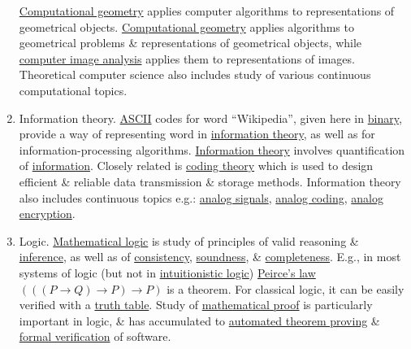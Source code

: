 \documentclass{article}
\begin{document}
\begin{enumerate}
	{\sf\href{https://en.wikipedia.org/wiki/Computational_geometry}{Computational geometry} applies computer algorithms to representations of geometrical objects.} \href{https://en.wikipedia.org/wiki/Computational_geometry}{Computational geometry} applies algorithms to geometrical problems \& representations of geometrical objects, while \href{https://en.wikipedia.org/wiki/Computer_image_analysis}{computer image analysis} applies them to representations of images. Theoretical computer science also includes study of various continuous computational topics.
	\item {\sf Information theory.} {\sf\href{https://en.wikipedia.org/wiki/ASCII}{ASCII} codes for word ``Wikipedia'', given here in \href{https://en.wikipedia.org/wiki/Binary_numeral_system}{binary}, provide a way of representing word in \href{https://en.wikipedia.org/wiki/Information_theory}{information theory}, as well as for information-processing algorithms.} \href{https://en.wikipedia.org/wiki/Information_theory}{Information theory} involves quantification of \href{https://en.wikipedia.org/wiki/Information}{information}. Closely related is \href{https://en.wikipedia.org/wiki/Coding_theory}{coding theory} which is used to design efficient \& reliable data transmission \& storage methods. Information theory also includes continuous topics e.g.: \href{https://en.wikipedia.org/wiki/Analog_signal}{analog signals}, \href{https://en.wikipedia.org/wiki/Analog_coding}{analog coding}, \href{https://en.wikipedia.org/wiki/Analog_encryption}{analog encryption}.
	\item {\sf Logic.} \href{https://en.wikipedia.org/wiki/Mathematical_logic}{Mathematical logic} is study of principles of valid reasoning \& \href{https://en.wikipedia.org/wiki/Inference}{inference}, as well as of \href{https://en.wikipedia.org/wiki/Consistency}{consistency}, \href{https://en.wikipedia.org/wiki/Soundness}{soundness}, \& \href{https://en.wikipedia.org/wiki/Completeness_(logic)}{completeness}. E.g., in most systems of logic (but not in \href{https://en.wikipedia.org/wiki/Intuitionistic_logic}{intuitionistic logic}) \href{https://en.wikipedia.org/wiki/Peirce%27s_law}{Peirce's law} $(((P\to Q)\to P)\to P)$ is a theorem. For classical logic, it can be easily verified with a \href{https://en.wikipedia.org/wiki/Truth_table}{truth table}. Study of \href{https://en.wikipedia.org/wiki/Mathematical_proof}{mathematical proof} is particularly important in logic, \& has accumulated to \href{https://en.wikipedia.org/wiki/Automated_theorem_proving}{automated theorem proving} \& \href{https://en.wikipedia.org/wiki/Formal_verification}{formal verification} of software.
	

\end{enumerate}
\end{document}

